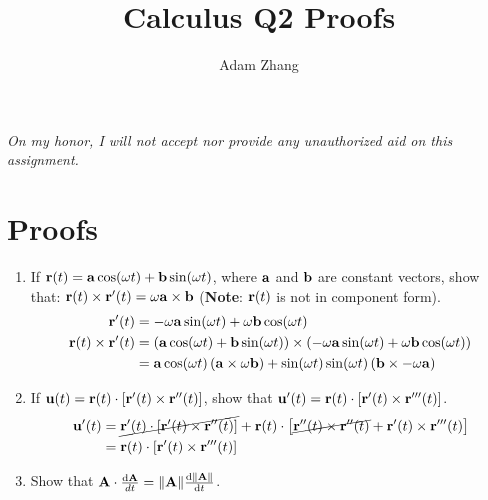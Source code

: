 \documentclass[11pt]{article}
\title{Calculus Q2 Proofs}
\author{Adam Zhang}
\renewcommand{\vec}[1]{\ensuremath\mathbf{#1}}
\begin{document}
\pagestyle{fancy}

\begin{center}
  \emph{On my honor, I will not accept nor provide any unauthorized aid on this assignment.}
\end{center}

\section*{Proofs}

\begin{enumerate}
\item If \(\vec{r}(t) = \vec{a}\cos(\omega t) + \vec{b}\sin(\omega t)\), where \(\vec{a}\) and \(\vec{b}\) are constant vectors, show that: \(\vec{r}(t) \times \vec{r} '(t) = \omega \vec{a} \times \vec{b}\) (\textbf{Note}: \(\vec{r}(t)\) is not in component form).
  \begin{align*}
    \vec{r}'(t) &= -\omega \vec{a}\sin(\omega t) + \omega \vec{b} \cos (\omega t) \\
    \vec{r}(t) \times \vec{r}'(t) &= \left( \vec{a} \cos(\omega t) + \vec{b}
                                    \sin(\omega t) \right) \times \left( -\omega
                                    \vec{a} \sin(\omega t) + \omega \vec{b}
                                    \cos(\omega t) \right) \\
                &= \vec{a}\cos(\omega t) \left( \vec{a} \times \omega \vec{b} \right) +
                  \sin(\omega t) \sin(\omega t) \left( \vec{b} \times -\omega \vec{a}
                  \right) \\
  \end{align*}
\item If \(\vec{u}(t) = \vec{r}(t) \cdot \left[ \vec{r}'(t) \times
    \vec{r}''(t) \right]\), show that \(\vec{u}'(t) = \vec{r}(t) \cdot \left[
    \vec{r}'(t) \times \vec{r}'''(t) \right]\).
  \begin{align*}
    \vec{u}'(t) &= \cancel{\vec{r}'(t) \cdot \left[ \vec{r}'(t) \times \vec{r}''(t)
                  \right]} + \vec{r}(t) \cdot \big[ \cancel{\vec{r}''(t) \times \vec{r}''(t)} +
                  \vec{r}'(t) \times \vec{r}'''(t) \big] \\
                &= \vec{r}(t) \cdot \left[ \vec{r}'(t) \times \vec{r}'''(t) \right]
  \end{align*}
\item Show that \(\vec{A} \cdot \frac{\mathrm{d}\vec{A}}{dt} = \lVert
  \vec{A} \rVert \frac{\mathrm{d} \lVert \vec{A} \rVert}{\mathrm{d}t}\).


\end{enumerate}
\end{document}
